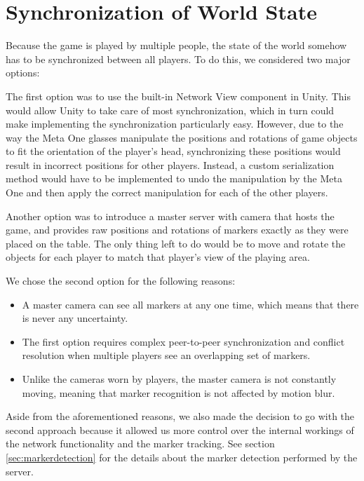     \section{Synchronization of World State} \label{sec:synchronization}
        Because the game is played by multiple people, the state of the world
        somehow has to be synchronized between all players. To do this, we 
        considered two major options:
        
        The first option was to use the built-in Network View component in 
        Unity. This would allow Unity to take care of most synchronization,
        which in turn could make implementing the synchronization particularly
        easy. However, due to the way the Meta One glasses manipulate the 
        positions and rotations of game objects to fit the orientation of the 
        player's head, synchronizing these positions would result in incorrect
        positions for other players. Instead, a custom serialization method 
        would have to be implemented to undo the manipulation by the Meta One
        and then apply the correct manipulation for each of the other players.

        Another option was to introduce a master server with camera that hosts
        the game, and provides raw positions and rotations of markers exactly as
        they were placed on the table. The only thing left to do would be to
        move and rotate the objects for each player to match that player's view
        of the playing area.

        We chose the second option for the following reasons:

        \begin{itemize}
            \item A master camera can see all markers at any one time, which
            means that there is never any uncertainty.
            \item The first option requires complex peer-to-peer synchronization
            and conflict resolution when multiple players see an overlapping set
            of markers.
            \item Unlike the cameras worn by players, the master camera is not
            constantly moving, meaning that marker recognition is not affected
            by motion blur.
        \end{itemize}
        
        Aside from the aforementioned reasons, we also made the decision to go
        with the second approach because it allowed us more control over the 
        internal workings of the network functionality and the marker tracking.
        See section \ref{sec:markerdetection} for the details about the marker
        detection performed by the server.

